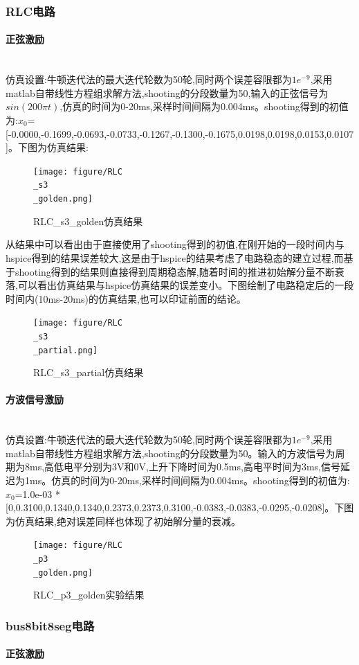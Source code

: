 \documentclass[12pt]{article}
\newcommand{\subsubsubsection}[1]{\paragraph{#1}\mbox{}\\}
\begin{document}
\begin{sloppypar}
\subsubsection{RLC电路}
\subsubsubsection{正弦激励}

\qquad 仿真设置:牛顿迭代法的最大迭代轮数为50轮,同时两个误差容限都为$1e^{-9}$,采用matlab自带线性方程组求解方法,shooting的分段数量为50,输入的正弦信号为$sin(200\pi t)$,仿真的时间为0-20ms,采样时间间隔为0.004ms。shooting得到的初值为:$x_0$=[-0.0000,-0.1699,-0.0693,-0.0733,-0.1267,-0.1300,-0.1675,0.0198,0.0198,0.0153,0.0107]。下图为仿真结果:

\begin{figure}[H]
  \centering
  \texttt{[image: figure/RLC\\\_s3\\\_golden.png]}
  \caption{RLC\_s3\_golden仿真结果}
\end{figure}

\qquad 从结果中可以看出由于直接使用了shooting得到的初值,在刚开始的一段时间内与hspice得到的结果误差较大,这是由于hspice的结果考虑了电路稳态的建立过程,而基于shooting得到的结果则直接得到周期稳态解,随着时间的推进初始解分量不断衰落,可以看出仿真结果与hspice仿真结果的误差变小。下图绘制了电路稳定后的一段时间内(10ms-20ms)的仿真结果,也可以印证前面的结论。

\begin{figure}[H]
  \centering
  \texttt{[image: figure/RLC\\\_s3\\\_partial.png]}
  \caption{RLC\_s3\_partial仿真结果}
\end{figure}

\subsubsubsection{方波信号激励}

\qquad 仿真设置:牛顿迭代法的最大迭代轮数为50轮,同时两个误差容限都为$1e^{-9}$,采用matlab自带线性方程组求解方法,shooting的分段数量为50。输入的方波信号为周期为8ms,高低电平分别为3V和0V,上升下降时间为0.5ms,高电平时间为3ms,信号延迟为1ms。仿真的时间为0-20ms,采样时间间隔为0.004ms。shooting得到的初值为:$x_0$=1.0e-03 * [0,0.3100,0.1340,0.1340,0.2373,0.2373,0.3100,-0.0383,-0.0383,-0.0295,-0.0208]。下图为仿真结果,绝对误差同样也体现了初始解分量的衰减。

\begin{figure}[H]
  \centering
  \texttt{[image: figure/RLC\\\_p3\\\_golden.png]}
  \caption{RLC\_p3\_golden实验结果}
\end{figure}


\subsubsection{bus8bit8seg电路}
\subsubsubsection{正弦激励}


\end{sloppypar}
\end{document}
